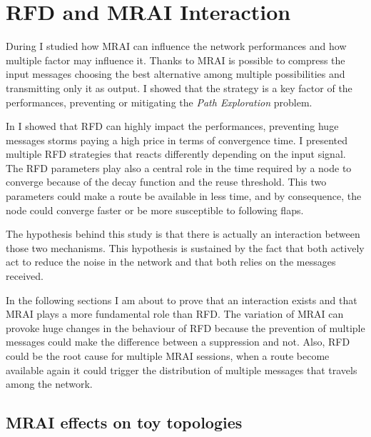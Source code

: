 \chapter{RFD and MRAI Interaction}
\label{cha:bgp_rfd_vs_mrai}

During  I studied how \ac{MRAI} can influence
the network performances and how multiple factor may influence it.
Thanks to \ac{MRAI} is possible to compress the input messages choosing the best
alternative among multiple possibilities and transmitting only it as output.
I showed that the strategy is a key factor of the performances, preventing or
mitigating the \textit{Path Exploration} problem.

In  I showed that \ac{RFD} can highly impact the performances,
preventing huge messages storms paying a high price in terms of convergence time.
I presented multiple \ac{RFD} strategies that reacts differently depending on
the input signal.
The \ac{RFD} parameters play also a central role in the time required by a node
to converge because of the decay function and the reuse threshold.
This two parameters could make a route be available in less time, and by consequence,
the node could converge faster or be more susceptible to following flaps.

The hypothesis behind this study is that there is actually an interaction between
those two mechanisms.
This hypothesis is sustained by the fact that both actively act to reduce the
noise in the network and that both relies on the messages received.

In the following sections I am about to prove that an interaction exists and that \ac{MRAI}
plays a more fundamental role than \ac{RFD}.
The variation of \ac{MRAI} can provoke huge changes in the behaviour of \ac{RFD}
because the prevention of multiple messages could make the difference between
a suppression and not.
Also, \ac{RFD} could be the root cause for multiple \ac{MRAI} sessions, when
a route become available again it could trigger the distribution of multiple
messages that travels among the network.

\section{MRAI effects on toy topologies}
\label{sec:bgp_rfd_toy}

%

